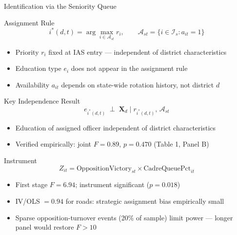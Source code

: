 \documentclass[aspectratio=169]{beamer}
\begin{document}
\begin{frame}{Identification via the Seniority Queue}

\begin{block}{Assignment Rule}
\[
i^*(d,t) = \arg\max_{i \in \mathcal{A}_{st}} r_i, \qquad
\mathcal{A}_{st} = \{i \in \mathcal{I}_s : a_{it} = 1\}
\]
\end{block}
\begin{itemize}\setlength\itemsep{4pt}
  \item Priority $r_i$ fixed at IAS entry --- independent of district characteristics
  \item Education type $e_i$ does not appear in the assignment rule
  \item Availability $a_{it}$ depends on state-wide rotation history, not district $d$
\end{itemize}

\bigskip

\begin{block}{Key Independence Result}
\[
e_{i^*(d,t)} \;\perp\; \mathbf{X}_d \;\Big|\; r_{i^*(d,t)},\, \mathcal{A}_{st}
\]
\end{block}
\begin{itemize}\setlength\itemsep{4pt}
  \item Education of assigned officer independent of district characteristics
  \item Verified empirically: joint $F = 0.89$,\; $p = 0.470$ (Table 1, Panel B)
\end{itemize}

\bigskip

\begin{block}{Instrument}
\[
Z_{it} = \mathrm{OppositionVictory}_{st} \times \mathrm{CadreQueuePct}_{it}
\]
\end{block}
\begin{itemize}\setlength\itemsep{4pt}
  \item First stage $F = 6.94$; instrument significant ($p = 0.018$)
  \item IV/OLS $= 0.94$ for roads: strategic assignment bias empirically small
  \item Sparse opposition-turnover events (20\% of sample) limit power ---
        longer panel would restore $F > 10$
\end{itemize}

\end{frame}
\end{document}
